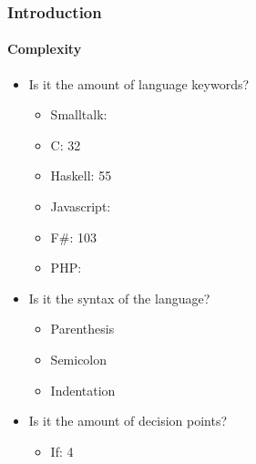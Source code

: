 \begin{frame}
    \frametitle{Introduction}
    \framesubtitle{Complexity}

    \begin{itemize}[<+->]
        \item Is it the amount of language keywords?
        \begin{itemize}
            \item Smalltalk: 
            \item C: 32
            \item Haskell: 55
            \item Javascript: 
            \item F\#: 103
            \item PHP: 
        \end{itemize}
        \item Is it the syntax of the language?
        \begin{itemize}
            \item Parenthesis
            \item Semicolon
            \item Indentation
        \end{itemize}
        \item Is it the amount of decision points?
        \begin{itemize}
            \item If: 4
        \end{itemize}
    \end{itemize}
\end{frame}

